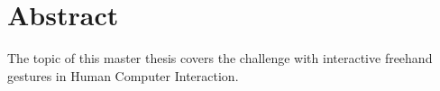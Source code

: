 \chapter*{Abstract}
The topic of this master thesis covers the challenge with interactive freehand gestures in Human Computer Interaction.







\hypersetup{pageanchor=false}